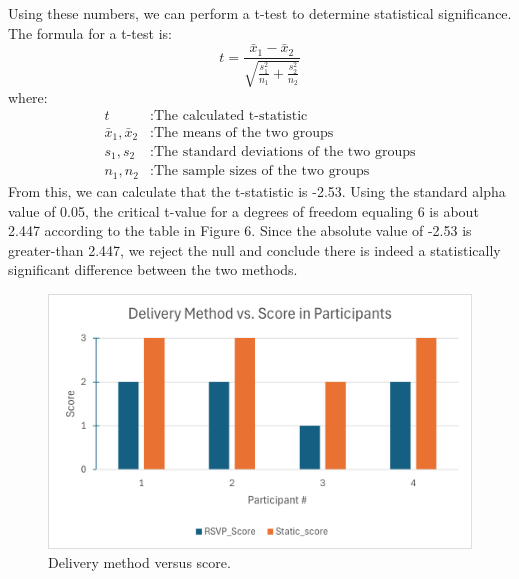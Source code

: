 \documentclass[manuscript,screen]{acmart}
\begin{document}
Using these numbers, we can perform a t-test to determine statistical significance. The formula for a t-test is:
\begin{equation}
t = \frac{\bar{x}_1 - \bar{x}_2}{\sqrt{\frac{{s_1^2}}{{n_1}} + \frac{{s_2^2}}{{n_2}}}}
\end{equation}
where:
\begin{align*}
t & : \text{The calculated t-statistic} \\
\bar{x}_1, \bar{x}_2 & : \text{The means of the two groups} \\
s_1, s_2 & : \text{The standard deviations of the two groups} \\
n_1, n_2 & : \text{The sample sizes of the two groups}
\end{align*}
From this, we can calculate that the t-statistic is -2.53. Using the standard alpha value of 0.05, the critical t-value for a degrees of freedom equaling 6 is about 2.447 according to the table in Figure 6. Since the absolute value of -2.53 is greater-than 2.447, we reject the null and conclude there is indeed a statistically significant difference between the two methods.

\begin{figure}[htbp]
  \centering
  \includegraphics[width=\linewidth]{Delivery vs Score.png}
  \caption{Delivery method versus score.}
\end{figure}
\end{document}
